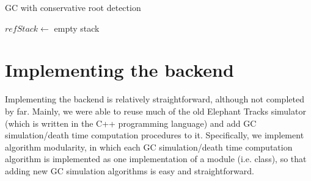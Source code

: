 \begin{algorithm}[H]
  \caption{GC with conservative root detection}
  $refStack \leftarrow$ empty stack\; 
\end{algorithm}


\section{Implementing the backend}
Implementing the backend is relatively straightforward, although not completed by far. Mainly, we were able to reuse much of the old Elephant Tracks
simulator (which is written in the C++ programming language) and add GC simulation/death time computation procedures to it. Specifically, we implement
algorithm modularity, in which each GC simulation/death time computation algorithm is implemented as one implementation of a module (i.e. class), so that
adding new GC simulation algorithms is easy and straightforward.
